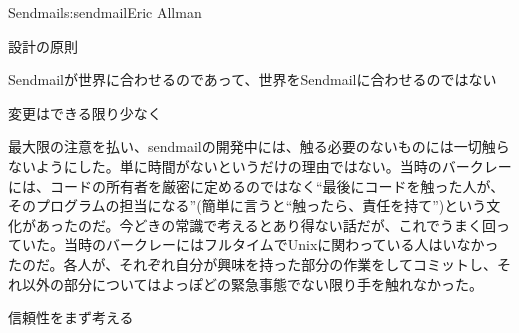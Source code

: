 \begin{aosachapter}{Sendmail}{s:sendmail}{Eric Allman}
\begin{aosasect1}{設計の原則}
\begin{aosasect2}{Sendmailが世界に合わせるのであって、世界をSendmailに合わせるのではない}
\end{aosasect2}

\begin{aosasect2}{変更はできる限り少なく}

最大限の注意を払い、sendmailの開発中には、触る必要のないものには一切触らないようにした。単に時間がないというだけの理由ではない。当時のバークレーには、コードの所有者を厳密に定めるのではなく``最後にコードを触った人が、そのプログラムの担当になる''(簡単に言うと``触ったら、責任を持て'')という文化があったのだ。今どきの常識で考えるとあり得ない話だが、これでうまく回っていた。当時のバークレーにはフルタイムでUnixに関わっている人はいなかったのだ。各人が、それぞれ自分が興味を持った部分の作業をしてコミットし、それ以外の部分についてはよっぽどの緊急事態でない限り手を触れなかった。

\end{aosasect2}

\begin{aosasect2}{信頼性をまず考える}


\end{aosasect2}
\end{aosasect1}
\end{aosachapter}
